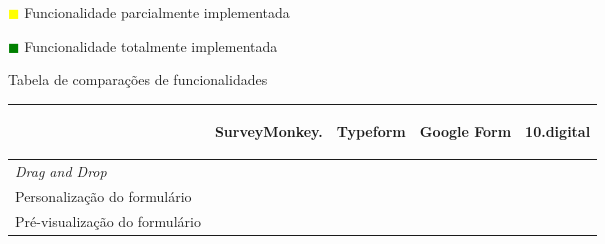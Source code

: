 \begin{table}[!ht]
	   \hspace{1.2cm}     \textcolor{yellow}{$\blacksquare$} Funcionalidade parcialmente implementada
	   
	    \hspace{1.2cm}     \textcolor{green}{$\blacksquare$} Funcionalidade totalmente implementada 
	   \begin{center}
\caption{Tabela de comparações de funcionalidades}
\label{tab:comparacao1}
\end{center}
\end{table}

\newpage
		

		\renewcommand{\arraystretch}{2.5}
		\setlength\arrayrulewidth{1.5pt}
	\begin{table}[!ht]  
		\begin{center}
		\begin{tabular}{|p{4cm}|p{1.5cm}|p{1.5cm}|p{1.5cm}|p{1.5cm}|}
			\cline{2-5}
			\multicolumn{1}{c|}{} & \hspace{0.6cm}\begin{sideways}SurveyMonkey.\end{sideways} & \hspace{0.6cm}\begin{sideways}Typeform\end{sideways} & \hspace{0.6cm}\begin{sideways}Google Form\end{sideways} &\hspace{0.6cm}\begin{sideways} 10.digital\end{sideways}\\ \hline
			
		
				\textit{Drag and Drop} & \cellcolor{green!80}   & \cellcolor{red!80}  & \cellcolor{red!80} & \cellcolor{red!80} \\ \hline
				
			Personalização do formulário& \cellcolor{green!80}    & \cellcolor{green!80}   & \cellcolor{yellow!80} & \cellcolor{green!80}   \\ \hline
			
			 Pré-visualização do formulário& \cellcolor{green!80}  & \cellcolor{green!80}  & \cellcolor{green!80} & \cellcolor{green!80} \\ \hline
			 

\end{tabular}
\end{center}
\end{table}
